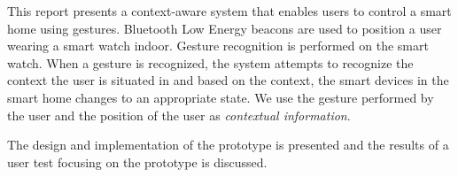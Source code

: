 This report presents a context-aware system that enables users to control a smart home using gestures. Bluetooth Low Energy beacons are used to position a user wearing a smart watch indoor. Gesture recognition is performed on the smart watch. When a gesture is recognized, the system attempts to recognize the context the user is situated in and based on the context, the smart devices in the smart home changes to an appropriate state. We use the gesture performed by the user and the position of the user as \emph{contextual information}.

The design and implementation of the prototype is presented and the results of a user test focusing on the prototype is discussed.


